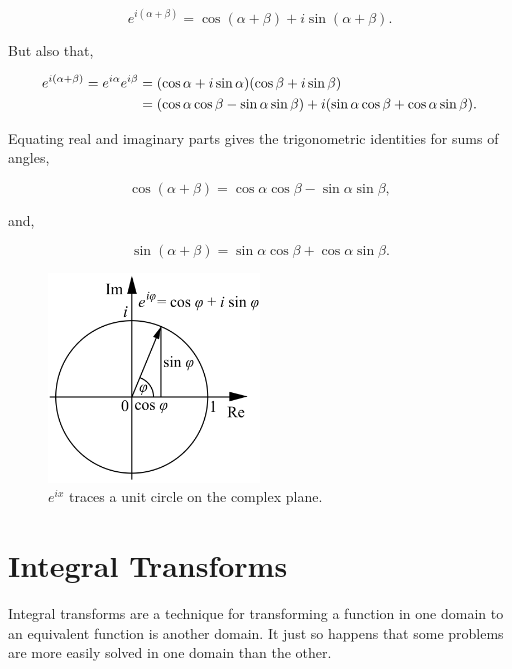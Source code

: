 \documentclass[11pt]{amsart}
\begin{document}
$$e^{i(\alpha + \beta)} = \cos (\alpha + \beta) + i\sin (\alpha + \beta).$$

But also that,

\begin{align}
e^{i(\alpha + \beta)} = e^{i\alpha}e^{i\beta} &= (\cos \alpha + i\sin \alpha)(\cos \beta + i\sin \beta) \notag \\
&= (\cos\alpha\cos\beta - \sin\alpha\sin\beta) + i(\sin\alpha\cos\beta + \cos\alpha\sin\beta).\notag
\end{align}

Equating real and imaginary parts gives the trigonometric identities for sums of angles,

$$\cos (\alpha + \beta) = \cos\alpha\cos\beta - \sin\alpha\sin\beta,$$

and,

$$\sin (\alpha + \beta) = \sin\alpha\cos\beta + \cos\alpha\sin\beta.$$

\begin{figure}[!ht]
\centering
\includegraphics[width=0.5\textwidth]{Figures/eulersformula.png}
\caption{$e^{ix}$ traces a unit circle on the complex plane.\cite{eulerformula}}
\label{fig:eulersformula}
\end{figure}

\section{Integral Transforms}

Integral transforms are a technique for transforming a function in one domain to an equivalent function is another domain. It just so happens that some problems are more easily solved in one domain than the other.

%
\end{document}
